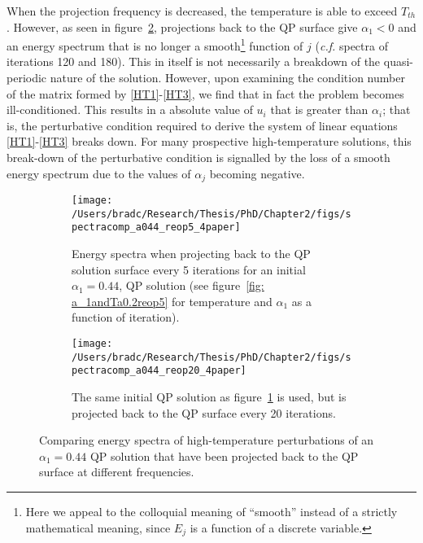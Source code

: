 \documentclass[../PhD.tex]{subfiles}
\begin{document}
When the projection frequency is decreased, the temperature is able to exceed $T_{th}$. However, as seen in figure~\ref{fig: spec comparisons reop20}, projections back to the QP surface give $\alpha_1 < 0$ and an energy spectrum that is no longer a smooth\footnote{Here we appeal to the colloquial meaning of ``smooth'' instead of a strictly mathematical meaning, since $E_j$ is a function of a discrete variable.} function of $j$ ({\it c.f.} spectra of iterations 120 and 180). This in itself is not necessarily a breakdown of the quasi-periodic nature of the solution. However, upon examining the condition number of the matrix formed by \eqref{HT1}-\eqref{HT3}, we find that in fact the problem becomes ill-conditioned. This results in a absolute value of $u_i$ that is greater than $\alpha_i$; that is, the perturbative condition required to derive the system of linear equations \eqref{HT1}-\eqref{HT3} breaks down. For many prospective high-temperature solutions, this break-down of the perturbative condition is signalled by the loss of a smooth energy spectrum due to the values of $\alpha_j$ becoming negative. 

\vspace{0.1in}

\begin{figure}[H]
	\centering
	\begin{subfigure}[t]{0.47\textwidth}
		\texttt{[image: /Users/bradc/Research/Thesis/PhD/Chapter2/figs/spectracomp\_a044\_reop5\_4paper]}
		\caption{Energy spectra when projecting back to the QP solution surface every 5 iterations for an initial ${\alpha_1 = 0.44}$, QP solution (see figure~\ref{fig: a_1andTa0.2reop5} for temperature and $\alpha_1$ as a function of iteration).}
		\label{fig: spec comparisons reop5}
	\end{subfigure}
	\hfill
	\begin{subfigure}[t]{0.47\textwidth}
		\texttt{[image: /Users/bradc/Research/Thesis/PhD/Chapter2/figs/spectracomp\_a044\_reop20\_4paper]}
		\caption{The same initial QP solution as figure~\ref{fig: spec comparisons reop5} is used, but is projected back to the QP surface every 20 iterations.}
		\label{fig: spec comparisons reop20}
	\end{subfigure}
	\caption[Energy spectra resulting from perturbing the same QP solution at differing frequencies]{Comparing energy spectra of high-temperature perturbations of an $\alpha_1=0.44$ QP solution that have been projected back to the QP surface at different frequencies.}
	\label{fig: spec comps with reop}
\end{figure}
\end{document}
